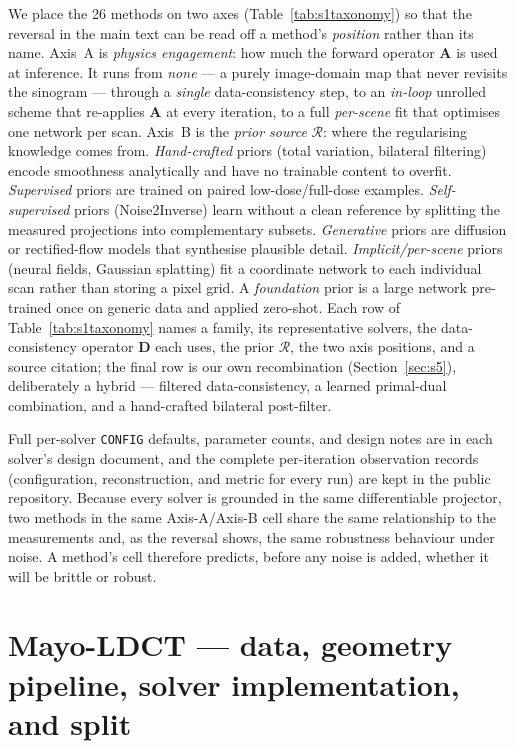 \documentclass[AMA,twocolumn]{USG}
\begin{document}
We place the 26 methods on two axes (Table~\ref{tab:s1taxonomy}) so that the reversal in the main text can be read off a method's \emph{position} rather than its name. Axis~A is \emph{physics engagement}: how much the forward operator $\mathbf{A}$ is used at inference. It runs from \emph{none} --- a purely image-domain map that never revisits the sinogram --- through a \emph{single} data-consistency step, to an \emph{in-loop} unrolled scheme that re-applies $\mathbf{A}$ at every iteration, to a full \emph{per-scene} fit that optimises one network per scan. Axis~B is the \emph{prior source} $\mathcal{R}$: where the regularising knowledge comes from. \emph{Hand-crafted} priors (total variation, bilateral filtering) encode smoothness analytically and have no trainable content to overfit. \emph{Supervised} priors are trained on paired low-dose/full-dose examples. \emph{Self-supervised} priors (Noise2Inverse) learn without a clean reference by splitting the measured projections into complementary subsets. \emph{Generative} priors are diffusion or rectified-flow models that synthesise plausible detail. \emph{Implicit/per-scene} priors (neural fields, Gaussian splatting) fit a coordinate network to each individual scan rather than storing a pixel grid. A \emph{foundation} prior is a large network pre-trained once on generic data and applied zero-shot. Each row of Table~\ref{tab:s1taxonomy} names a family, its representative solvers, the data-consistency operator $\mathbf{D}$ each uses, the prior $\mathcal{R}$, the two axis positions, and a source citation; the final row is our own recombination (Section~\ref{sec:s5}), deliberately a hybrid --- filtered data-consistency, a learned primal-dual combination, and a hand-crafted bilateral post-filter.

Full per-solver \texttt{CONFIG} defaults, parameter counts, and design notes are in each solver's design document, and the complete per-iteration observation records (configuration, reconstruction, and metric for every run) are kept in the public repository. Because every solver is grounded in the same differentiable projector, two methods in the same Axis-A/Axis-B cell share the same relationship to the measurements and, as the reversal shows, the same robustness behaviour under noise. A method's cell therefore predicts, before any noise is added, whether it will be brittle or robust.

\section{Mayo-LDCT --- data, geometry pipeline, solver implementation, and split}\label{sec:s2}
\end{document}

